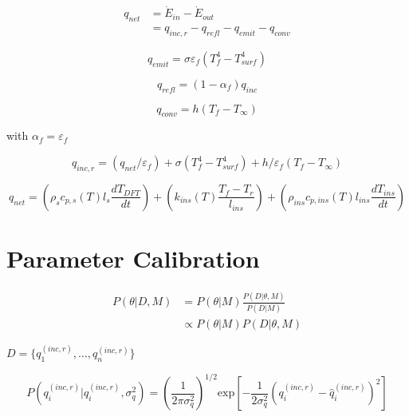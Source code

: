 \documentclass[article]{proc}
\begin{document}
\begin{align}\label{eq:q_net}
    q_{net} &= \dot{E}_{in} - \dot{E}_{out} \\
        &= q_{inc,r} - q_{refl} - q_{emit} - q_{conv}
\end{align}

\begin{equation}\label{eq:q_emit}
    q_{emit} = \sigma \varepsilon_f (T_f^4 - T_{surf}^4)
\end{equation}

\begin{equation}\label{eq:q_refl}
    q_{refl} = (1 - \alpha_f)q_{inc}
\end{equation}

\begin{equation}\label{eq:q_conv}
    q_{conv} = h (T_f - T_{\infty})
\end{equation}

\noindent with $\alpha_f = \varepsilon_f$

\begin{equation}\label{eq:q_inc}
    q_{inc,r} = (q_{net}/\varepsilon_f) + \sigma (T_f^4 - T_{surf}^4) + h/\varepsilon_f (T_f - T_{\infty})
\end{equation}

\begin{equation}\label{eq:esm}
    q_{net} = \left(\rho_s c_{p,s}(T) l_s \frac{dT_{DFT}}{dt} \right) + \left( k_{ins}(T) \frac{T_f - T_r}{l_{ins}} \right) + \left(\rho_{ins} c_{p,ins}(T) l_{ins} \frac{dT_{ins}}{dt}\right)
\end{equation}

\section{Parameter Calibration}

\begin{align}\label{eq:bayes}
    P(\theta | D, M) &= P(\theta|M) \frac{P(D|\theta, M)}{P(D|M)}\\
        &\propto P(\theta|M) P(D|\theta, M)
\end{align}

\noindent $D = \{q^{(inc,r)}_1, \dots, q^{(inc,r)}_n \}$

\begin{equation}\label{eq:likelihood}
    P(q_i^{(inc,r)}| \hat{q}_i^{(inc,r)}, \sigma_q^2) = \left(\frac{1}{2 \pi \sigma_q^2} \right)^{1/2} \text{exp} \left[-\frac{1}{2 \sigma_q^2} \left( q_i^{(inc,r)} - \hat{q}_i^{(inc,r)} \right)^2 \right]
\end{equation}
\end{document}
